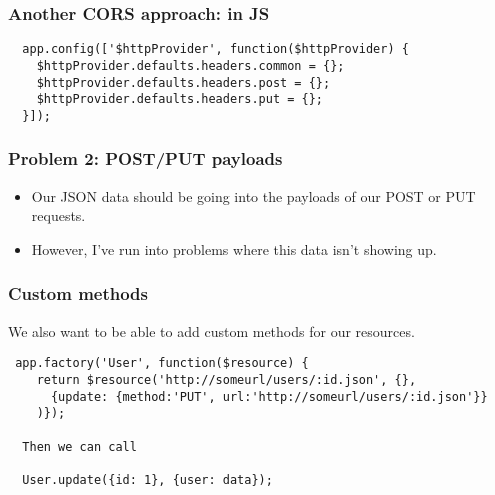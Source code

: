 \documentclass[10pt]{beamer}
\begin{document}
\begin{frame}[fragile]
  \frametitle{Another CORS approach: in JS}

 \begin{verbatim}
  app.config(['$httpProvider', function($httpProvider) {
    $httpProvider.defaults.headers.common = {};
    $httpProvider.defaults.headers.post = {};
    $httpProvider.defaults.headers.put = {};
  }]);
 \end{verbatim}

\end{frame}



\begin{frame}
  \frametitle{Problem 2: POST/PUT payloads}

 \begin{itemize}
  \item Our JSON data should be going into the payloads of our POST or PUT 
        requests.
  \item However, I've run into problems where this data isn't showing up.
 \end{itemize}
\end{frame}


\begin{frame}[fragile]
  \frametitle{Custom methods}
 We also want to be able to add custom methods for our resources.
 \begin{verbatim}
 app.factory('User', function($resource) {
    return $resource('http://someurl/users/:id.json', {},
      {update: {method:'PUT', url:'http://someurl/users/:id.json'}}
    )});

  Then we can call 

  User.update({id: 1}, {user: data});
  
 \end{verbatim}


\end{frame}
\end{document}
